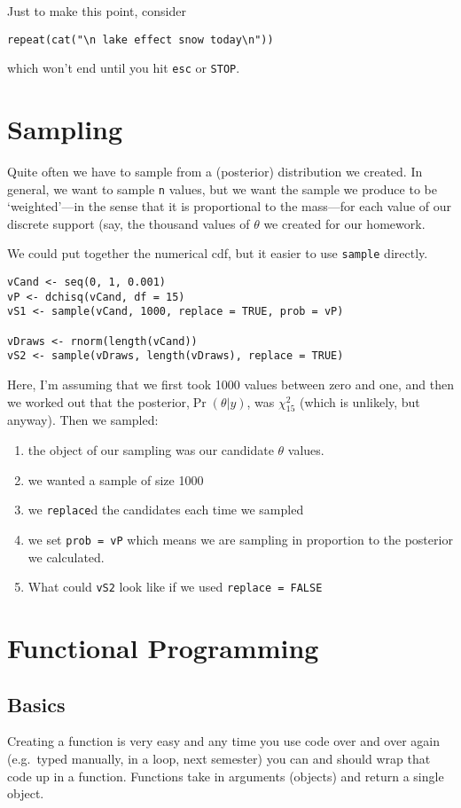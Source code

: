 Just to make this point, consider
\begin{verbatim}
repeat(cat("\n lake effect snow today\n"))
\end{verbatim}
which won't end until you hit \texttt{esc} or \texttt{STOP}.

\section{Sampling}
Quite often we have to sample from a (posterior) distribution we
created. In general, we want to sample \texttt{n} values, but we want
the sample we produce to be `weighted'---in the sense that it is
proportional to the mass---for each value of our discrete support
(say, the thousand values of $\theta$ we created for our homework.

We could put together the numerical cdf, but it easier to use
\texttt{sample} directly.
\begin{verbatim}
vCand <- seq(0, 1, 0.001)
vP <- dchisq(vCand, df = 15)
vS1 <- sample(vCand, 1000, replace = TRUE, prob = vP)

vDraws <- rnorm(length(vCand))
vS2 <- sample(vDraws, length(vDraws), replace = TRUE)
\end{verbatim}

Here, I'm assuming that we first took 1000 values between zero and
one, and then we worked out that the posterior,$\Pr(\theta|y)$, was
$\chi^2_{15}$ (which is unlikely, but anyway).  Then we sampled:
\begin{enumerate}
\item the object of our sampling was our candidate $\theta$ values.%
\item we wanted a sample of size 1000
\item we \texttt{replace}d the candidates each time we sampled
\item we set \texttt{prob = vP} which means we are sampling in
proportion to the posterior we calculated.
\item What could \texttt{vS2} look like if we used \texttt{replace = FALSE}

\end{enumerate}

\section{Functional Programming}
\subsection{Basics}
Creating a function is very easy and any time you use code over and
over again (e.g.\ typed manually, in a loop, next semester) you can
and should wrap that code up in a function. Functions take in
arguments (objects) and return a single object.

